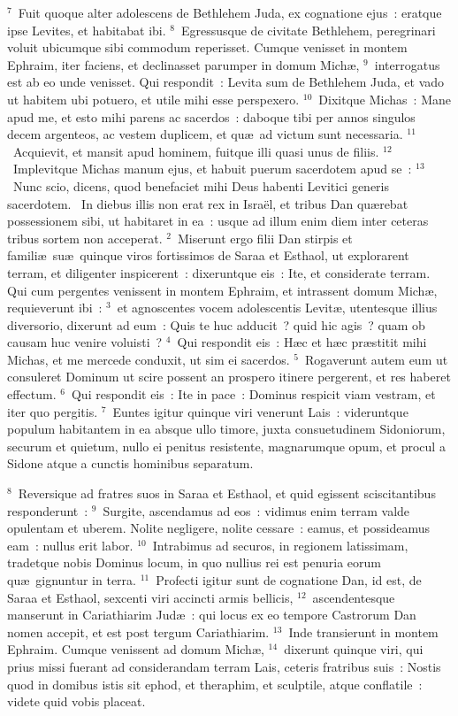 ${}^{7}$~Fuit quoque alter adolescens de Bethlehem Juda, ex cognatione ejus~: eratque ipse Levites, et habitabat ibi.
${}^{8}$~Egressusque de civitate Bethlehem, peregrinari voluit ubicumque sibi commodum reperisset. Cumque venisset in montem Ephraim, iter faciens, et declinasset parumper in domum Mich\ae ,
${}^{9}$~interrogatus est ab eo unde venisset. Qui respondit~: Levita sum de Bethlehem Juda, et vado ut habitem ubi potuero, et utile mihi esse perspexero.
${}^{10}$~Dixitque Michas~: Mane apud me, et esto mihi parens ac sacerdos~: daboque tibi per annos singulos decem argenteos, ac vestem duplicem, et qu\ae\ ad victum sunt necessaria.
${}^{11}$~Acquievit, et mansit apud hominem, fuitque illi quasi unus de filiis.
${}^{12}$~Implevitque Michas manum ejus, et habuit puerum sacerdotem apud se~:
${}^{13}$~Nunc scio, dicens, quod benefaciet mihi Deus habenti Levitici generis sacerdotem.
~In diebus illis non erat rex in Isra\"el, et tribus Dan qu\ae rebat possessionem sibi, ut habitaret in ea~: usque ad illum enim diem inter ceteras tribus sortem non acceperat.
${}^{2}$~Miserunt ergo filii Dan stirpis et famili\ae\ su\ae\ quinque viros fortissimos de Saraa et Esthaol, ut explorarent terram, et diligenter inspicerent~: dixeruntque eis~: Ite, et considerate terram. Qui cum pergentes venissent in montem Ephraim, et intrassent domum Mich\ae , requieverunt ibi~:
${}^{3}$~et agnoscentes vocem adolescentis Levit\ae , utentesque illius diversorio, dixerunt ad eum~: Quis te huc adducit~? quid hic agis~? quam ob causam huc venire voluisti~?
${}^{4}$~Qui respondit eis~: H\ae c et h\ae c pr\ae stitit mihi Michas, et me mercede conduxit, ut sim ei sacerdos.
${}^{5}$~Rogaverunt autem eum ut consuleret Dominum ut scire possent an prospero itinere pergerent, et res haberet effectum.
${}^{6}$~Qui respondit eis~: Ite in pace~: Dominus respicit viam vestram, et iter quo pergitis.
${}^{7}$~Euntes igitur quinque viri venerunt Lais~: videruntque populum habitantem in ea absque ullo timore, juxta consuetudinem Sidoniorum, securum et quietum, nullo ei penitus resistente, magnarumque opum, et procul a Sidone atque a cunctis hominibus separatum.


${}^{8}$~Reversique ad fratres suos in Saraa et Esthaol, et quid egissent sciscitantibus responderunt~:
${}^{9}$~Surgite, ascendamus ad eos~: vidimus enim terram valde opulentam et uberem. Nolite negligere, nolite cessare~: eamus, et possideamus eam~: nullus erit labor.
${}^{10}$~Intrabimus ad securos, in regionem latissimam, tradetque nobis Dominus locum, in quo nullius rei est penuria eorum qu\ae\ gignuntur in terra.
${}^{11}$~Profecti igitur sunt de cognatione Dan, id est, de Saraa et Esthaol, sexcenti viri accincti armis bellicis,
${}^{12}$~ascendentesque manserunt in Cariathiarim Jud\ae~: qui locus ex eo tempore Castrorum Dan nomen accepit, et est post tergum Cariathiarim.
${}^{13}$~Inde transierunt in montem Ephraim. Cumque venissent ad domum Mich\ae ,
${}^{14}$~dixerunt quinque viri, qui prius missi fuerant ad considerandam terram Lais, ceteris fratribus suis~: Nostis quod in domibus istis sit ephod, et theraphim, et sculptile, atque conflatile~: videte quid vobis placeat.


